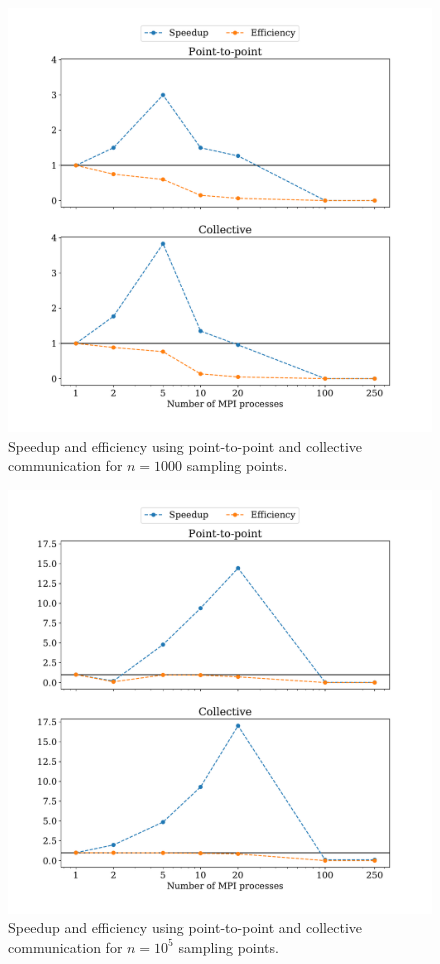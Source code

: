 \documentclass[a4paper, 11pt]{article}
\begin{document}
\begin{figure}
  \centering
  \includegraphics[width=\textwidth]{../trapezoid/plot/1000.pdf}
  \caption{Speedup and efficiency using point-to-point and collective communication for $n=1000$ sampling points.}
  \label{fig:1_n_1000}
\end{figure}
\begin{figure}
  \centering
  \includegraphics[width=\textwidth]{../trapezoid/plot/100000.pdf}
  \caption{Speedup and efficiency using point-to-point and collective communication for $n=10^{5}$ sampling points.}
  \label{fig:1_n_100k}
\end{figure}
\end{document}
